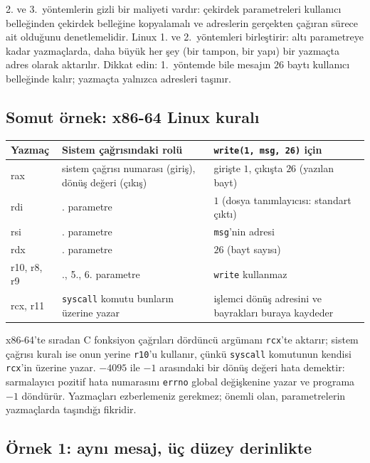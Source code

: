 \documentclass[11pt,a4paper]{article}
\newcommand{\cmd}[1]{\texttt{#1}}
\begin{document}
2. ve 3.~yöntemlerin gizli bir maliyeti vardır: çekirdek parametreleri kullanıcı belleğinden çekirdek belleğine kopyalamalı ve adreslerin gerçekten çağıran sürece ait olduğunu denetlemelidir. Linux 1. ve 2.~yöntemleri birleştirir: altı parametreye kadar yazmaçlarda, daha büyük her şey (bir tampon, bir yapı) bir yazmaçta adres olarak aktarılır. Dikkat edin: 1.~yöntemde bile mesajın $26$ baytı kullanıcı belleğinde kalır; yazmaçta yalnızca adresleri taşınır.

\subsection{Somut örnek: x86-64 Linux kuralı}

\begin{center}
\renewcommand{\arraystretch}{1.3}
\begin{tabularx}{\linewidth}{>{\ttfamily}l >{\raggedright\arraybackslash}X >{\raggedright\arraybackslash}X}
\toprule
\textrm{\textbf{Yazmaç}} & \textbf{Sistem çağrısındaki rolü} & \textbf{\texttt{write(1, msg, 26)} için} \\
\midrule
rax & sistem çağrısı numarası (giriş), dönüş değeri (çıkış) & girişte $1$, çıkışta $26$ (yazılan bayt) \\
rdi & 1. parametre & $1$ (dosya tanımlayıcısı: standart çıktı) \\
rsi & 2. parametre & \texttt{msg}'nin adresi \\
rdx & 3. parametre & $26$ (bayt sayısı) \\
r10, r8, r9 & 4., 5., 6. parametre & \cmd{write} kullanmaz \\
rcx, r11 & \texttt{syscall} komutu bunların üzerine yazar & işlemci dönüş adresini ve bayrakları buraya kaydeder \\
\bottomrule
\end{tabularx}
\end{center}

x86-64'te sıradan C fonksiyon çağrıları dördüncü argümanı \texttt{rcx}'te aktarır; sistem çağrısı kuralı ise onun yerine \texttt{r10}'u kullanır, çünkü \texttt{syscall} komutunun kendisi \texttt{rcx}'in üzerine yazar. $-4095$ ile $-1$ arasındaki bir dönüş değeri hata demektir: sarmalayıcı pozitif hata numarasını \texttt{errno} global değişkenine yazar ve programa $-1$ döndürür. Yazmaçları ezberlemeniz gerekmez; önemli olan, parametrelerin yazmaçlarda taşındığı fikridir.

\subsection{Örnek 1: aynı mesaj, üç düzey derinlikte}
\end{document}
